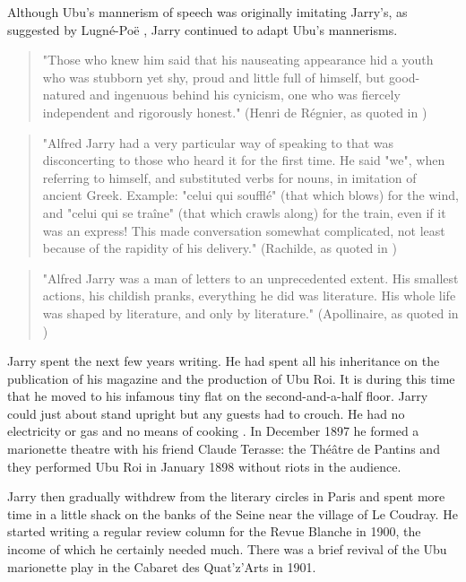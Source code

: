 Although Ubu's mannerism of speech was originally imitating Jarry's, as suggested by Lugné-Poë \citep[p.155]{Brotchie2011}, Jarry continued to adapt Ubu's mannerisms.

\begin{quote}
  "Those who knew him said that his nauseating appearance hid a youth who was stubborn yet shy, proud and little full of himself, but good-natured and ingenuous behind his cynicism, one who was fiercely independent and rigorously honest." (Henri de Régnier, as quoted in \citep[p.181]{Brotchie2011})
\end{quote}

\begin{quote}
  "Alfred Jarry had a very particular way of speaking to that was disconcerting to those who heard it for the first time. He said "we", when referring to himself, and substituted verbs for nouns, in imitation of ancient Greek. Example: "celui qui soufflé" (that which blows) for the wind, and "celui qui se traîne" (that which crawls along) for the train, even if it was an express! This made conversation somewhat complicated, not least because of the rapidity of his delivery." (Rachilde, as quoted in \citep[p.181]{Brotchie2011})
\end{quote}

\begin{quote}
  "Alfred Jarry was a man of letters to an unprecedented extent. His smallest actions, his childish pranks, everything he did was literature. His whole life was shaped by literature, and only by literature." (Apollinaire, as quoted in \citep[p.307]{Brotchie2011})
\end{quote}

Jarry spent the next few years writing. He had spent all his inheritance on the publication of his magazine and the production of Ubu Roi. It is during this time that he moved to his infamous tiny flat on the second-and-a-half floor. Jarry could just about stand upright but any guests had to crouch. He had no electricity or gas and no means of cooking \citep[p.195]{Brotchie2011}. In December 1897 he formed a marionette theatre with his friend Claude Terasse: the Théâtre de Pantins and they performed Ubu Roi in January 1898 without riots in the audience.

Jarry then gradually withdrew from the literary circles in Paris and spent more time in a little shack on the banks of the Seine near the village of Le Coudray. He started writing a regular review column for the Revue Blanche in 1900, the income of which he certainly needed much. There was a brief revival of the Ubu marionette play in the Cabaret des Quat'z'Arts in 1901.

